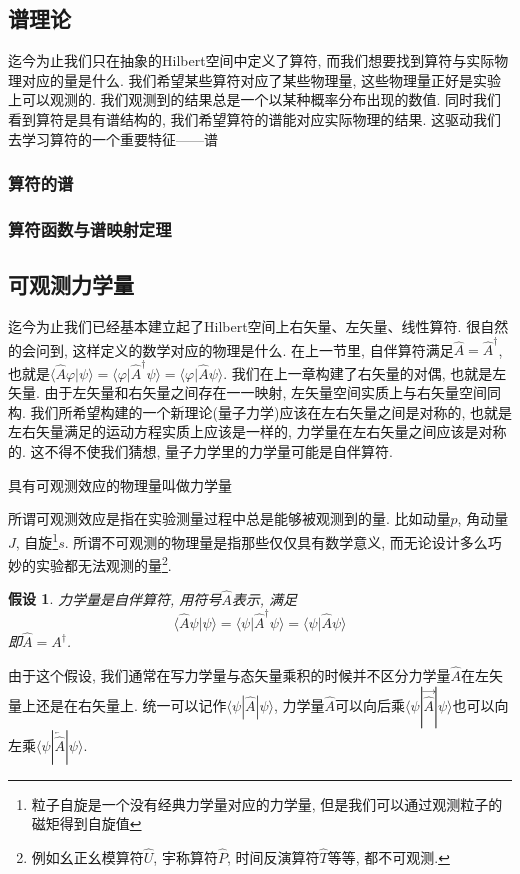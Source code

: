 \documentclass[a4paper,11pt]{article}
\theoremstyle{mystyle}
\newtheorem{hypothesis}{\hspace{2em}假设}[section]
\begin{document}
\subsection{谱理论}
迄今为止我们只在抽象的Hilbert空间中定义了算符, 而我们想要找到算符与实际物理对应的量是什么. 我们希望某些算符对应了某些物理量, 这些物理量正好是实验上可以观测的. 我们观测到的结果总是一个以某种概率分布出现的数值. 同时我们看到算符是具有谱结构的, 我们希望算符的谱能对应实际物理的结果. 这驱动我们去学习算符的一个重要特征------谱
\subsubsection{算符的谱}

\subsubsection{算符函数与谱映射定理}
\subsection{可观测力学量}
迄今为止我们已经基本建立起了Hilbert空间上右矢量、左矢量、线性算符. 很自然的会问到, 这样定义的数学对应的物理是什么. 在上一节里, 自伴算符满足$\hat{A}=\hat{A}^{\dag}$, 也就是$\langle\hat{A}\varphi|\psi\rangle=\langle\varphi|\hat{A}^{\dag}\psi\rangle=\langle\varphi|\hat{A}\psi\rangle$. 我们在上一章构建了右矢量的对偶, 也就是左矢量. 由于左矢量和右矢量之间存在一一映射, 左矢量空间实质上与右矢量空间同构. 我们所希望构建的一个新理论(量子力学)应该在左右矢量之间是对称的, 也就是左右矢量满足的运动方程实质上应该是一样的, 力学量在左右矢量之间应该是对称的. 这不得不使我们猜想, 量子力学里的力学量可能是自伴算符.
\begin{definition}
  具有可观测效应的物理量叫做力学量
\end{definition}
所谓可观测效应是指在实验测量过程中总是能够被观测到的量. 比如动量$p$, 角动量$J$, 自旋\footnote{粒子自旋是一个没有经典力学量对应的力学量, 但是我们可以通过观测粒子的磁矩得到自旋值}$s$. 所谓不可观测的物理量是指那些仅仅具有数学意义, 而无论设计多么巧妙的实验都无法观测的量\footnote{例如幺正幺模算符$\hat{U}$, 宇称算符$\hat{P}$, 时间反演算符$\hat{T}$等等, 都不可观测.}.
\begin{hypothesis}
  力学量是自伴算符, 用符号$\hat{A}$表示, 满足
\begin{equation*}
  \langle\hat{A}\psi|\psi\rangle=\langle\psi|\hat{A}^{\dag}\psi\rangle=\langle\psi|\hat{A}\psi\rangle
\end{equation*}
即$\hat{A}=A^{\dag}$.
\end{hypothesis}
由于这个假设, 我们通常在写力学量与态矢量乘积的时候并不区分力学量$\hat{A}$在左矢量上还是在右矢量上. 统一可以记作$\langle\psi|\hat{A}|\psi\rangle$, 力学量$\hat{A}$可以向后乘$\langle\psi|\overrightarrow{\hat{A}}|\psi\rangle$也可以向左乘$\langle\psi|\overleftarrow{\hat{A}}|\psi\rangle$.
\end{document}
